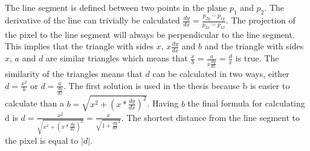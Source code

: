 The line segment is defined between two points in the plane $p_1$ and $p_2$. The derivative of the line can trivially be calculated $\frac{dy}{dx}=\frac{p_{2y}-p_{1y}}{p_{2x}-p_{1x}}$. The projection of the pixel to the line segment will always be perpendicular to the line segment. This implies that the triangle with sides $x$, $x\frac{dy}{dx}$ and $b$ and the triangle with sides $x$, $a$ and $d$ are similar triangles which means that $\frac{x}{b}=\frac{a}{x\frac{dy}{dx}}=\frac{d}{x}$ is true. The similarity of the triangles means that $d$ can be calculated in two ways, either $d=\frac{x^2}{b}$ or $d=\frac{a}{\frac{dy}{dx}}$. The first solution is used in the thesis because b is easier to calculate than a $b=\sqrt{x^2+(x*\frac{dy}{dx})^2}$. Having $b$ the final formula for calculating d is $d=\frac{x^2}{\sqrt{x^2+(x*\frac{dy}{dx})^2}}=\frac{x}{\sqrt{1+\frac{dy}{dx}^2}}$. The shortest distance from the line segment to the pixel is equal to $|d|$.
